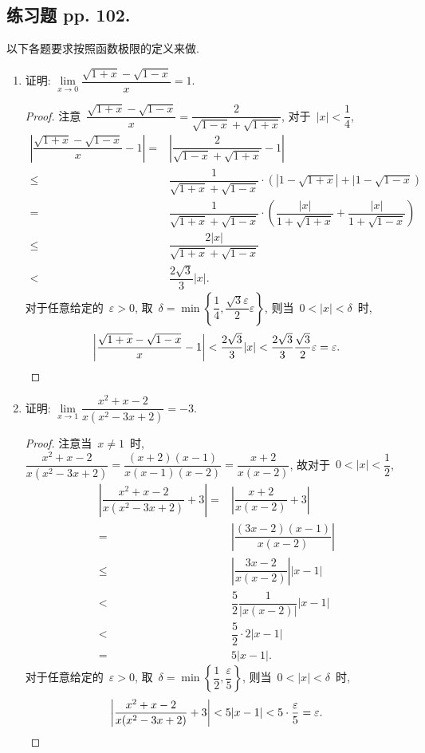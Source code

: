 \documentclass[UTF8,a4paper,11pt,twoside]{book}
\begin{document}
\subsection{练习题 pp. 102.}
以下各题要求按照函数极限的定义来做.
\begin{enumerate}
	\item 证明: $\lim\limits_{x\to 0} \dfrac{\sqrt{1+x}-\sqrt{1-x}}{x}=1$.
	      \begin{proof}
		      注意~$\dfrac{\sqrt{1+x}-\sqrt{1-x}}{x}=\dfrac{2}{\sqrt{1-x}+\sqrt{1+x}}$, 对于~$|x|<\dfrac{1}{4}$,
		      \[
			      \begin{split}
				      \left| \dfrac{\sqrt{1+x}-\sqrt{1-x}}{x}-1\right|=&\left|\dfrac{2}{\sqrt{1-x}+\sqrt{1+x}}-1\right|\\
				      \leqslant&\dfrac{1}{\sqrt{1+x}+\sqrt{1-x}}\cdot(|1-\sqrt{1+x}|+|1-\sqrt{1-x})\\
				      =&\dfrac{1}{\sqrt{1+x}+\sqrt{1-x}}\cdot\left(\dfrac{|x|}{1+\sqrt{1+x}}+\dfrac{|x|}{1+\sqrt{1-x}}\right)\\
				      \leqslant&\dfrac{2|x|}{\sqrt{1+x}+\sqrt{1-x}}\\
				      <&\dfrac{2\sqrt{3}}{3}|x|.
			      \end{split}
		      \]
		      对于任意给定的~$\varepsilon>0$, 取~$\delta=\min\left\{\dfrac{1}{4}, \dfrac{\sqrt{3}\varepsilon}{2}\varepsilon\right\}$, 则当~$0<|x|<\delta$~时,
		      \[
			      \left| \dfrac{\sqrt{1+x}-\sqrt{1-x}}{x}-1\right|<\dfrac{2\sqrt{3}}{3}|x|<\dfrac{2\sqrt{3}}{3}\dfrac{\sqrt{3}}{2}\varepsilon=\varepsilon. \qedhere
		      \]
	      \end{proof}

	\item 证明: $\lim\limits_{x\to 1} \dfrac{x^2+x-2}{x(x^2-3x+2)}=-3$.
	      \begin{proof}
		      注意当~$x\neq 1$~时, $\dfrac{x^2+x-2}{x(x^2-3x+2)}=\dfrac{(x+2)(x-1)}{x(x-1)(x-2)}=\dfrac{x+2}{x(x-2)}$, 故对于~$0<|x|<\dfrac{1}{2}$,
		      \[
			      \begin{split}
				      \left|\dfrac{x^2+x-2}{x(x^2-3x+2)}+3\right|=&\left|\dfrac{x+2}{x(x-2)}+3\right|\\
				      =&\left|\dfrac{(3x-2)(x-1)}{x(x-2)}\right|\\
				      \leqslant& \left|\dfrac{3x-2}{x(x-2)}\right||x-1|\\
				      <&\dfrac{5}{2}\dfrac{1}{|x(x-2)|}|x-1|\\
				      <&\dfrac{5}{2}\cdot 2|x-1|\\
				      =&5|x-1|.
			      \end{split}
		      \]
		      对于任意给定的~$\varepsilon>0$, 取~$\delta=\min\left\{\dfrac{1}{2}, \dfrac{\varepsilon}{5}\right\}$, 则当~$0<|x|<\delta$~时,
		      \[
			      \left|\dfrac{x^2+x-2}{x(x^2-3x+2)}+3\right|<5|x-1|<5\cdot\dfrac{\varepsilon}{5}=\varepsilon. \qedhere
		      \]
	      \end{proof}


\end{enumerate}
\end{document}
